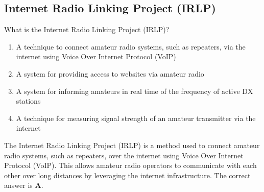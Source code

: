 \subsection{Internet Radio Linking Project (IRLP)}
\label{T8C08}

\begin{tcolorbox}[colback=gray!10!white,colframe=black!75!black,title=T8C08]
What is the Internet Radio Linking Project (IRLP)?
\begin{enumerate}[noitemsep]
    \item A technique to connect amateur radio systems, such as repeaters, via the internet using Voice Over Internet Protocol (VoIP)
    \item A system for providing access to websites via amateur radio
    \item A system for informing amateurs in real time of the frequency of active DX stations
    \item A technique for measuring signal strength of an amateur transmitter via the internet
\end{enumerate}
\end{tcolorbox}

The Internet Radio Linking Project (IRLP) is a method used to connect amateur radio systems, such as repeaters, over the internet using Voice Over Internet Protocol (VoIP). This allows amateur radio operators to communicate with each other over long distances by leveraging the internet infrastructure. The correct answer is \textbf{A}.